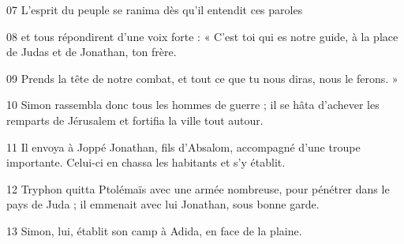 
07 L’esprit du peuple se ranima dès qu’il entendit ces paroles

08 et tous répondirent d’une voix forte : « C’est toi qui es notre guide, à la place de Judas et de Jonathan, ton frère.

09 Prends la tête de notre combat, et tout ce que tu nous diras, nous le ferons. »

10 Simon rassembla donc tous les hommes de guerre ; il se hâta d’achever les remparts de Jérusalem et fortifia la ville tout autour.

11 Il envoya à Joppé Jonathan, fils d’Absalom, accompagné d’une troupe importante. Celui-ci en chassa les habitants et s’y établit.

12 Tryphon quitta Ptolémaïs avec une armée nombreuse, pour pénétrer dans le pays de Juda ; il emmenait avec lui Jonathan, sous bonne garde.

13 Simon, lui, établit son camp à Adida, en face de la plaine.

